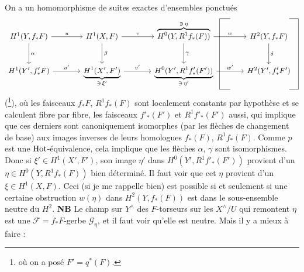 \noindent On a un homomorphisme de suites exactes d'ensembles ponctués
\[
\begin{tikzcd}[column sep=large, row sep=large,
  every matrix/.append style={name=m},
  execute at end picture={
    \coordinate (lb) at ([xshift=0.4em]m-2-3.east);
    \coordinate (lt) at ([xshift=1.8em]m-2-3.east);
    \draw (lt |- m-1-3.north) -- (lb |- m-1-3.north) -- (lb |- m-2-3.south) -- (lt |- m-2-3.south);
    \coordinate (rb) at ([xshift=0.6em]m-2-4.east);
    \coordinate (rt) at ([xshift=-0.6em]m-2-4.east);
    \draw (rt |- m-1-3.north) -- (rb |- m-1-3.north) -- (rb |- m-2-3.south) -- (rt |- m-2-3.south);
  }]
H^1(Y, f_*F) \arrow[r, "u"] \arrow[d, "\alpha"] & H^1(X,F) \arrow[r, "v"] \arrow[d, "\beta"] & \overbrace{H^0(Y, R^1 f_*(F))}^{\ni\, \eta} \arrow[r, "w"] \arrow[d, "\gamma"] & H^2(Y, f_*F) \arrow[d, "\delta"] \\
H^1(Y', f'_*F) \arrow[r, "u'"] & \underbrace{H^1(X', F')}_{\ni\, \xi'} \arrow[r, "v'"] & \underbrace{H^0(Y', R^1 f'_*(F'))}_{\ni\, \eta'} \arrow[r, "w'"] & H^2(Y', f'_*F') %
\end{tikzcd}
\]
(\footnote{où on a posé $F' = q^*(F)$.}), où les faisceaux $f_*F$, $R^1 f_*(F)$ sont localement constants par hypothèse et se calculent fibre par fibre, les faisceaux $f'_*(F')$ et $R^1 f'_*(F')$ aussi, qui implique que ces derniers sont
canoniquement isomorphes (par les flèches de changement de base) aux images inverses de leurs homologues $f_*(F)$, $R^1 f_*(F)$. Comme $p$ est une $\mathrm{Hot}$-équivalence, cela implique que les flèches $\alpha$, $\gamma$ sont isomorphismes. Donc si $\xi' \in H^1(X', F')$, son image $\eta'$ dans $H^0(Y', R^1 f'_*(F'))$ provient d'un $\eta \in H^0(Y, R^1 f_*(F))$ bien déterminé. Il faut voir que cet $\eta$ provient d'un $\xi \in H^1(X,F)$. Ceci (si je me rappelle bien) est possible si et seulement si une certaine obstruction $w(\eta)$ dans $H^2(Y, f_*(F))$ est dans le sous-ensemble neutre du $H^2$. \textbf{NB} Le champ sur $Y^\wedge$ des $F$-torseurs sur les $X^\wedge/U$ qui remontent $\eta$ est une $\mathcal{F} = f_*F$-gerbe $\mathcal{G}_\eta$, et il faut voir qu'elle est neutre. Mais il y a mieux à faire :

